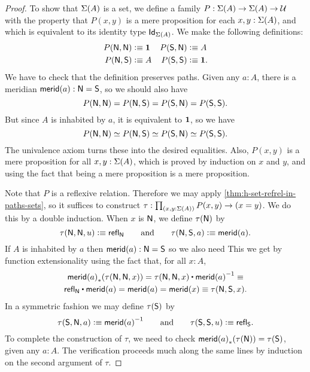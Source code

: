 \begin{proof}
To show that $\Sigma(A)$ is a set, we define a
family $P:\Sigma(A)\to\Sigma(A)\to\mathcal{U}$ with the 
property that $P(x,y)$ is a mere proposition for each $x,y:\Sigma(A)$,
and which is equivalent to its identity type $\mathsf{Id}_{\Sigma(A)}$.
%
We make the following definitions:
\begin{align*}
P(\mathsf{N},\mathsf{N}) & \vcentcolon\equiv \mathbf{1} &
P(\mathsf{S},\mathsf{N}) & \vcentcolon\equiv A\\
P(\mathsf{N},\mathsf{S}) & \vcentcolon\equiv A &
P(\mathsf{S},\mathsf{S}) & \vcentcolon\equiv \mathbf{1}.
\end{align*}
We have to check that the definition preserves paths.
Given any $a : A$, there is a meridian $\mathsf{merid}(a) : \mathsf{N} = \mathsf{S}$,
so we should also have
%
\begin{equation*}
  P(\mathsf{N}, \mathsf{N}) = P(\mathsf{N}, \mathsf{S}) = P(\mathsf{S}, \mathsf{N}) = P(\mathsf{S}, \mathsf{S}).
\end{equation*}
%
But since $A$ is inhabited by $a$, it is equivalent to $\mathbf{1}$, so we have
%
\begin{equation*}
  P(\mathsf{N}, \mathsf{N}) \simeq P(\mathsf{N}, \mathsf{S}) \simeq P(\mathsf{S}, \mathsf{N}) \simeq P(\mathsf{S}, \mathsf{S}).
\end{equation*}
%
The univalence axiom turns these into the desired equalities. Also, $P(x,y)$ is a mere
proposition for all $x, y : \Sigma(A)$, which is proved by induction on $x$ and $y$, and
using the fact that being a mere proposition is a mere proposition.

Note that $P$ is a reflexive relation.
Therefore we may apply \autoref{thm:h-set-refrel-in-paths-sets}, so it suffices to
construct $\tau : \prd{x,y:\susp(A)}P(x,y)\to(x=y)$. We do this by a double induction.
When $x$ is $\mathsf{N}$, we define $\tau(\mathsf{N})$ by
%
\begin{equation*}
  \tau(\mathsf{N},\mathsf{N},u) \vcentcolon\equiv \mathsf{refl}_{\mathsf{N}}
  \qquad\text{and}\qquad
  \tau(\mathsf{N},\mathsf{S},a) \vcentcolon\equiv \mathsf{merid}(a).
\end{equation*}
%
If $A$ is inhabited by $a$ then $\mathsf{merid}(a) : \mathsf{N} = \mathsf{S}$ so we also need
This we get by function extensionality using the fact that, for all $x : A$,
%
\begin{multline*}
  \trans{\merid(a)}{\tau(\north,\north,x)} =
  \tau(\north,\north,x) \ct \opp{\merid(a)} \jdeq \\
  \refl{\north} \ct \merid(a) =
  \merid(a) =
  \merid(x) \jdeq
  \tau(\north, \south, x).
\end{multline*}
In a symmetric fashion we may define $\tau(\mathsf{S})$ by
%
\begin{equation*}
  \tau(\mathsf{S},\mathsf{N}, a) \vcentcolon\equiv \mathord{{\mathsf{merid}(a)}^{-1}}
  \qquad\text{and}\qquad
  \tau(\mathsf{S},\mathsf{S}, u) \vcentcolon\equiv \mathsf{refl}_{\mathsf{S}}.
\end{equation*}
%
To complete the construction of $\tau$, we need to check ${\mathsf{merid}(a)}_{*}\mathopen{}\left({\tau(\mathsf{N})}\right)\mathclose{} = \tau(\mathsf{S})$,
given any $a : A$. The verification proceeds much along the same lines by induction on the
second argument of $\tau$.


\end{proof}
